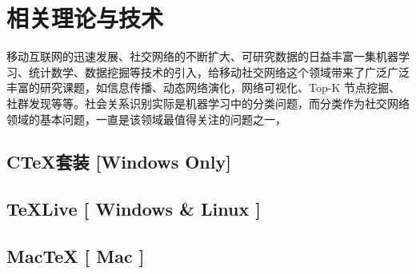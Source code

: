 \chapter{相关理论与技术}
移动互联网的迅速发展、社交网络的不断扩大、可研究数据的日益丰富一集机器学习、统计数学、数据挖掘等技术的引入，给移动社交网络这个领域带来了广泛广泛丰富的研究课题，如信息传播、动态网络演化，网络可视化、Top-K 节点挖掘、社群发现等等。社会关系识别实际是机器学习中的分类问题，而分类作为社交网络领域的基本问题，一直是该领域最值得关注的问题之一，

\section{C\TeX{}套装 [Windows Only]}


\section{\TeX{}Live [ Windows \& Linux ]}



\section{Mac\TeX{} [ Mac ]}
